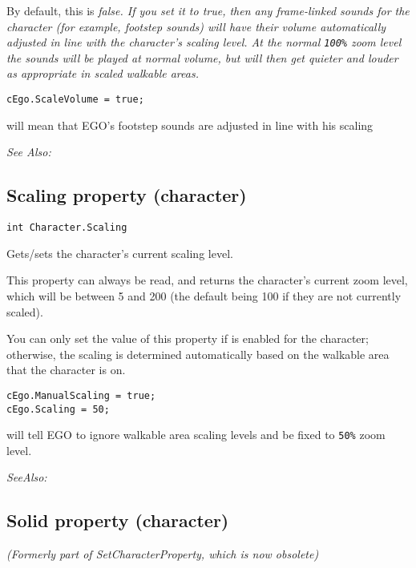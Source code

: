 By default, this is \it{false}. If you set it to \it{true}, then any frame-linked
sounds for the character (for example, footstep sounds) will have their volume
automatically adjusted in line with the character's scaling level. At the normal \verb$100%$
zoom level the sounds will be played at normal volume, but will then get quieter
and louder as appropriate in scaled walkable areas.

\begin{verbatim}
cEgo.ScaleVolume = true;
\end{verbatim}
will mean that EGO's footstep sounds are adjusted in line with his scaling

\it{See Also:} 


\subsection{Scaling property (character)}\label{Character.Scaling}%

\begin{verbatim}
int Character.Scaling
\end{verbatim}
Gets/sets the character's current scaling level.

This property can always be read, and returns the character's current zoom level, which
will be between 5 and 200 (the default being 100 if they are not currently scaled).

You can only set the value of this property if 
is enabled for the character; otherwise, the scaling is determined automatically based on
the walkable area that the character is on.

\begin{verbatim}
cEgo.ManualScaling = true;
cEgo.Scaling = 50;
\end{verbatim}
will tell EGO to ignore walkable area scaling levels and be fixed to \verb$50%$ zoom level.

\it{SeeAlso:} 


\subsection{Solid property (character)}\label{Character.Solid}%

\it{(Formerly part of SetCharacterProperty, which is now obsolete)}

